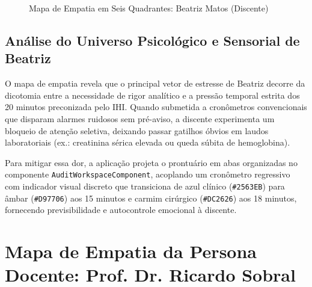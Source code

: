 \begin{figure}[!ht]
{
}
\caption{Mapa de Empatia em Seis Quadrantes: Beatriz Matos (Discente)}
\label{fig_mapa_empatia_beatriz}
\end{figure}

\subsection{Análise do Universo Psicológico e Sensorial de Beatriz}
O mapa de empatia revela que o principal vetor de estresse de Beatriz decorre da dicotomia entre a necessidade de rigor analítico e a pressão temporal estrita dos 20 minutos preconizada pelo IHI. Quando submetida a cronômetros convencionais que disparam alarmes ruidosos sem pré-aviso, a discente experimenta um bloqueio de atenção seletiva, deixando passar gatilhos óbvios em laudos laboratoriais (ex.: creatinina sérica elevada ou queda súbita de hemoglobina).

Para mitigar essa dor, a aplicação projeta o prontuário em abas organizadas no componente \texttt{AuditWorkspaceComponent}, acoplando um cronômetro regressivo com indicador visual discreto que transiciona de azul clínico (\texttt{\#2563EB}) para âmbar (\texttt{\#D97706}) aos 15 minutos e carmim cirúrgico (\texttt{\#DC2626}) aos 18 minutos, fornecendo previsibilidade e autocontrole emocional à discente.

\section{Mapa de Empatia da Persona Docente: Prof. Dr. Ricardo Sobral}
\label{sec_mapa_ricardo}

